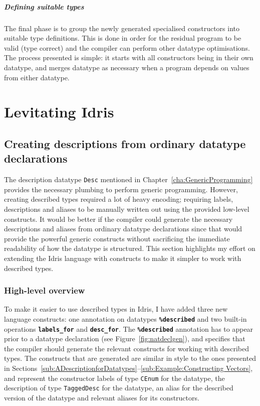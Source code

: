 \documentclass{ituthesis}
\newcommand{\tttype}[1]{\textcolor{type-color}{\texttt{#1}}}
\newcommand{\ttdec}[1]{\textcolor{declared-var-color}{\texttt{#1}}}
\theoremstyle{break}
\begin{document}
\paragraph{Defining suitable types}
\label{par:Defining suitable types}
The final phase is to group the newly generated specialised constructors into suitable type definitions.
This is done in order for the residual program to be valid (type correct) and the compiler can perform other datatype optimisations.
The process presented is simple: it starts with all constructors being in their own datatype, and merges datatype as necessary when a program depends on values from either datatype.

\chapter{Levitating Idris}
\label{cha:LevitatingIdris}

\section{Creating descriptions from ordinary datatype declarations}
\label{sec:Creating descriptions from ordinary data declarations}
The description datatype \tttype{Desc} mentioned in Chapter~\ref{cha:GenericProgramming} provides the necessary plumbing to perform generic programming.
However, creating described types required a lot of heavy encoding; requiring labels, descriptions and aliases to be manually written out using the provided low-level constructs.
It would be better if the compiler could generate the necessary descriptions and aliases from ordinary datatype declarations since that would provide the powerful generic constructs without sacrificing the immediate readability of how the datatype is structured.
This section highlights my effort on extending the Idris language with constructs to make it simpler to work with described types.

\subsection{High-level overview}
\label{sub:High-level overview}
To make it easier to use described types in Idris, I have added three new language constructs: one annotation on datatypes \texttt{\textbf{\%described}} and two built-in operations \texttt{\textbf{labels\_for}} and \texttt{\textbf{desc\_for}}.
The \texttt{\textbf{\%described}} annotation has to appear prior to a datatype declaration (see Figure~\ref{fig:natdeclgen}), and specifies that the compiler should generate the relevant constructs for working with described types.
The constructs that are generated are similar in style to the ones presented in Sections~\ref{sub:ADescriptionforDatatypes}--\ref{sub:Example:Constructing Vectors}, and represent the constructor labels of type \tttype{CEnum} for the datatype, the description of type \ttdec{TaggedDesc} for the datatype, an alias for the described version of the datatype and relevant aliases for its constructors.
\end{document}
